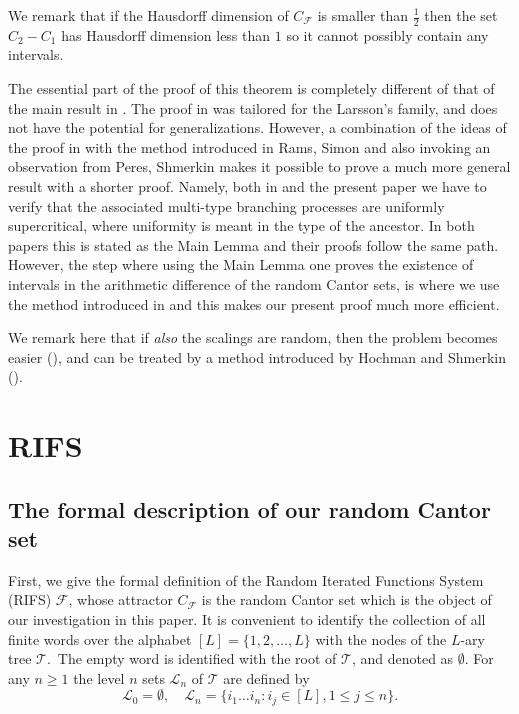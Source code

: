 \documentclass[amssymb,amsfonts,12pt,verbatim,righttag,oneside]{amsart}
\numberwithin{equation}{section} %
\theoremstyle{plain}
\newcommand{\fmu}{\ensuremath{\,}}
\theoremstyle{plain}
\begin{document}
We remark that if the Hausdorff dimension of $C_{\mathcal{F}}$ is
smaller than $\frac{1}{2}$ then the set $C _2-C _1$ has Hausdorff
dimension less than $1$  so it cannot possibly contain any
intervals.

The essential part of the proof of this theorem is completely different of that of the main result in \cite{dekking2011algebraic}.
The proof in \cite{dekking2011algebraic} was tailored for the Larsson's family, and does not have the potential for generalizations.
However, a combination of  the ideas of the proof in
\cite{dekking2011algebraic} with the method introduced in Rams, Simon \cite{Rams-Simon} and also invoking
an observation from Peres, Shmerkin \cite{Peres-Shmerkin} makes it possible to prove a much more general result with a shorter proof.
Namely, both in  \cite{dekking2011algebraic} and the present paper we have to verify that the associated multi-type branching processes are uniformly supercritical, where uniformity is meant in the type of the ancestor.
In both papers this is stated as the Main Lemma and their  proofs follow the same path.
However, the step where using the Main Lemma one  proves the existence of intervals in the arithmetic difference of the random Cantor sets, is where we use the method introduced in \cite{Rams-Simon} and this makes our present proof much more efficient.

We remark here that if \emph{also} the scalings are random, then  the problem becomes easier (\cite{oral-Shmerkin}), and can be treated by a method introduced by Hochman and Shmerkin (\cite{Hochman-Shmerkin}).	



\section{RIFS}


\subsection{The formal description of our random Cantor set}\label{304}

First, we give the formal definition of the Random Iterated Functions System (RIFS) $\mathcal{F}$, whose attractor
$C_\mathcal{F}$ is the random Cantor set which is the object of our investigation in this paper.
It is convenient to identify the collection of all finite words over the alphabet $[L]=\{1,2,\dots,L\}$ with the nodes  of the $L$-ary tree $\mathcal{T}$.
\fmu The empty word is identified with the root of $\mathcal{T}$, and  denoted as  $\emptyset$.
For any $n\ge 1$ the level $n$ sets $\mathcal{L}_n$  of $\mathcal{T}$ are defined by
\begin{equation*}
 \mathcal{L}_0=\emptyset, \quad \mathcal{L}_n=\{i_1\dots i_n: i_j\in [L], 1\le j\le n\}.
\end{equation*}
\end{document}
